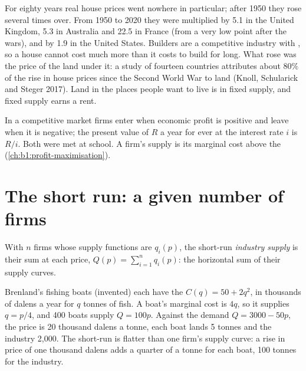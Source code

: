 For eighty years real house prices went nowhere in particular; after 1950
they rose several times over. From 1950 to 2020 they were multiplied by 5.1
in the United Kingdom, 5.3 in Australia and 22.5 in France (from a very low
point after the wars), and by 1.9 in the United States. %
Builders are a competitive industry with , so a house cannot cost
much more than it costs to build for long. What rose was the price of the
land under it: a study of fourteen countries attributes about $80\%$ of the
rise in house prices since the Second World War to land (Knoll, Schularick
and Steger 2017). %
Land in the places people want to live is in fixed supply, and fixed
supply earns a rent.

\begin{recall}
In a competitive market firms enter when economic profit is positive and
leave when it is negative; the present value of $R$ a year for ever at the
interest rate $i$ is $R/i$. Both were met at school. A firm's supply is its
marginal cost above the 
(\cref{ch:b1:profit-maximisation}).
\end{recall}

\section{The short run: a given number of firms}\label{sec:b1:competitive-industry:short-run}

\begin{definition}\label{def:b1:competitive-industry:industry-supply}
With $n$ firms whose supply functions are $q_i(p)$, the short-run
\emph{industry supply} is their sum at each price,
$Q(p) = \sum_{i=1}^n q_i(p)$: the horizontal sum of their supply curves.
\end{definition}

Brenland's fishing boats (invented) each have the 
$C(q) = 50 + 2q^2$, in thousands of dalens a year for $q$ tonnes of fish. A
boat's marginal cost is $4q$, so it supplies $q = p/4$, and 400 boats supply
$Q = 100p$. Against the demand $Q = 3000 - 50p$, the price is 20 thousand
dalens a tonne, each boat lands 5 tonnes and the industry 2,000. The
short-run  is flatter than one firm's supply curve: a rise
in price of one thousand dalens adds a quarter of a tonne for each boat, 100
tonnes for the industry.

